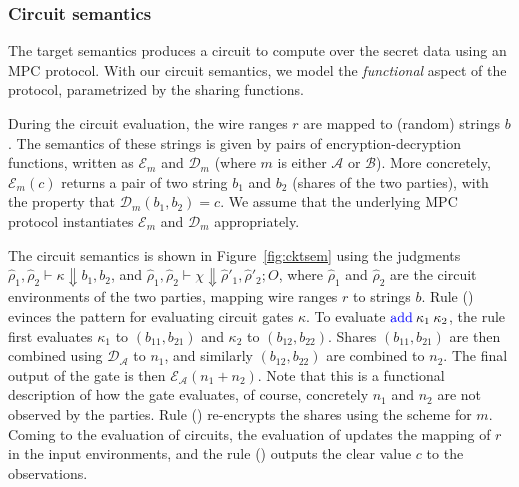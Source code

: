 \subsubsection*{Circuit semantics} The target semantics produces a
circuit to compute over the secret data using an MPC protocol. With
our circuit semantics, we model the \emph{functional} aspect of the
protocol, parametrized by the sharing functions.

During the circuit evaluation, the wire ranges $r$ are
mapped to (random) strings $b$. The semantics of these strings is
given by pairs of encryption-decryption functions, written as
$\mathcal{E}_{m}$ and $\mathcal{D}_{m}$ (where $m$ is either
$\mathcal{A}$ or $\mathcal{B}$). More concretely,
$\mathcal{E}_{m}(c)$ returns a pair of two string $b_{1}$ and $b_{2}$
(shares of the two parties), with the property that
$\mathcal{D}_{m}(b_{1}, b_{2}) = c$. We assume that the underlying MPC
protocol instantiates $\mathcal{E}_{m}$ and $\mathcal{D}_{m}$
appropriately.

The circuit semantics is shown in Figure~\ref{fig:cktsem} using the
judgments $\widehat{\rho}_{1}, \widehat{\rho}_{2} \vdash \kappa
\Downarrow b_{1}, b_{2}$, and $\widehat{\rho}_{1}, \widehat{\rho}_{2}
\vdash \chi \Downarrow \widehat{\rho}'_{1}, \widehat{\rho}'_{2}; O$,
where $\widehat{\rho}_{1}$ and $\widehat{\rho}_{2}$ are the circuit
environments of the two parties, mapping wire ranges $r$ to strings
$b$. Rule ({}) evinces the pattern for evaluating circuit
gates $\kappa$. To evaluate $\kw{add}\:\kappa_{1}\:\kappa_{2}$, the
rule first evaluates $\kappa_{1}$ to $(b_{11}, b_{21})$ and
$\kappa_{2}$ to $(b_{12}, b_{22})$. Shares $(b_{11}, b_{21})$ are then
combined using $\mathcal{D_{\mathcal{A}}}$ to $n_{1}$, and similarly
$(b_{12}, b_{22})$ are combined to $n_{2}$. The final output of the
 gate is then $\mathcal{E}_{\mathcal{A}}(n_{1} + n_{2})$. Note
that this is a functional description of how the  gate
evaluates, of course, concretely $n_{1}$ and $n_{2}$ are not observed
by the parties. Rule ({}) re-encrypts the shares using the
scheme for $m$. Coming to the evaluation of circuits, the evaluation
of  updates the mapping of $r$ in the input environments, and
the rule ({}) outputs the clear value $c$ to the
observations.

